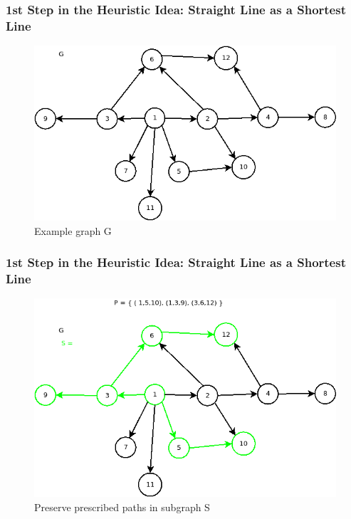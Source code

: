 \documentclass[
	11pt, %
]{beamer}
\begin{document}
\begin{frame}
      \frametitle{1st Step in the Heuristic Idea: Straight Line as a Shortest Line}
	\begin{figure}
		\includegraphics[width=0.8\linewidth]{Figur01.png}
		\caption{Example graph G}
	\end{figure}
\end{frame}

\begin{frame}
      \frametitle{1st Step in the Heuristic Idea: Straight Line as a Shortest Line}
	\begin{figure}
		\includegraphics[width=0.8\linewidth]{Figur02.png}
		\caption{Preserve prescribed paths in subgraph S}
	\end{figure}
\end{frame}
\end{document}
